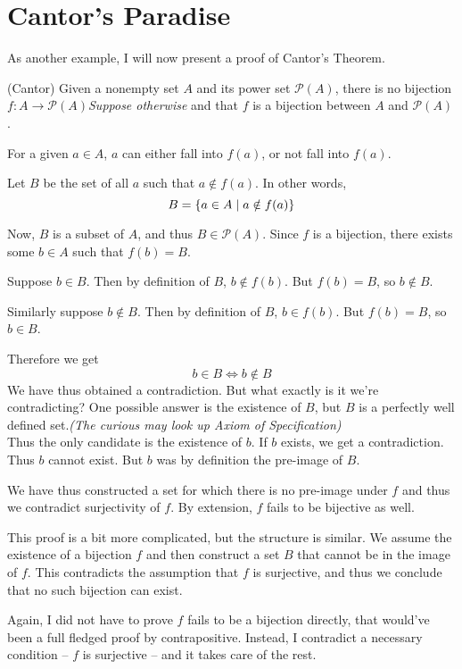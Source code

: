 \section*{Cantor's Paradise}
As another example, I will now present a proof of Cantor's Theorem.

\begin{SWP}{\thm}{(Cantor) Given a nonempty set $A$ and its power set $\mathcal P(A)$, there is no bijection $f: A \rightarrow \mathcal P(A)$}\textit{Suppose otherwise} and that $f$ is a bijection between $A$ and $\mathcal P(A)$.

For a given $a \in A$, $a$ can either fall into $f(a)$, or not fall into $f(a)$.

Let $B$ be the set of all $a$ such that $a \notin f(a)$. In other words,
$$B = \{ a \in A \space \mid \space a \notin f(a) \}$$

Now, $B$ is a subset of $A$, and thus $B \in \mathcal P(A)$. Since $f$ is a bijection, there exists some $b \in A$ such that $f(b) = B$.

Suppose $b \in B$. Then by definition of $B$, $b \notin f(b)$. But $f(b) = B$, so $b \notin B$.

Similarly suppose $b \notin B$. Then by definition of $B$, $b \in f(b)$. But $f(b) = B$, so $b \in B$.

Therefore we get
$$
b \in B \iff b \notin B
$$
We have thus obtained a contradiction. But what exactly is it we're contradicting? One possible answer is the existence of $B$, but $B$ is a perfectly well defined set.\hfill{\footnotesize\itshape(The curious may look up Axiom of Specification)}\\

Thus the only candidate is the existence of $b$. If $b$ exists, we get a contradiction. Thus $b$ cannot exist. But $b$ was by definition the pre-image of $B$. 

We have thus constructed a set for which there is no pre-image under $f$ and thus we contradict surjectivity of $f$. By extension, $f$ fails to be bijective as well.
\end{SWP}
This proof is a bit more complicated, but the structure is similar. We assume the existence of a bijection $f$ and then construct a set $B$ that cannot be in the image of $f$. This contradicts the assumption that $f$ is surjective, and thus we conclude that no such bijection can exist.

Again, I did not have to prove $f$ fails to be a bijection directly, that would've been a full fledged proof by contrapositive. Instead, I contradict a necessary condition -- $f$ is surjective -- and it takes care of the rest.


